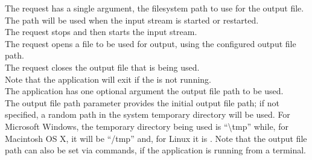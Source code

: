 The  request has a single argument,
the file\longDash{}system path to use for the output file.
The path will be used when the input stream is started or restarted.\\

The  request stops and then
starts the input stream.\\

The  request opens a file to be
used for output, using the configured output file path.\\

The  request closes the output
file that is being used.\\

Note that the application will exit if the
 is not running.\\

The application has one optional argument \longDash{} the output file path to be used.
\insertAppParameters{}
\insertOutputServiceComment{}\\

The output file path parameter provides the initial output file path; if not specified, a
random path in the system temporary directory will be used.
For Microsoft Windows, the temporary directory being used is ``\textbackslash{}tmp''
while, for Macintosh OS X, it will be ``/tmp'' and, for Linux it is \TBD.
Note that the output file path can also be set via commands, if the application is
running from a terminal.\\

